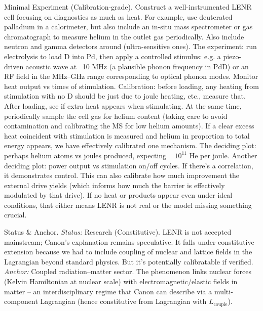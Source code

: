 \documentclass[11pt]{article}
\begin{document}
\begin{enumerate}
\end{enumerate}

Minimal Experiment (Calibration-grade). Construct a well-instrumented LENR cell focusing on diagnostics as much as heat. For example, use deuterated palladium in a calorimeter, but also include an in-situ mass spectrometer or gas chromatograph to measure helium in the outlet gas periodically. Also include neutron and gamma detectors around (ultra-sensitive ones). The experiment: run electrolysis to load D into Pd, then apply a controlled stimulus: e.g. a piezo-driven acoustic wave at ~10 MHz (a plausible phonon frequency in PdD) or an RF field in the MHz–GHz range corresponding to optical phonon modes. Monitor heat output vs times of stimulation. Calibration: before loading, any heating from stimulation with no D should be just due to joule heating, etc., measure that. After loading, see if extra heat appears when stimulating. At the same time, periodically sample the cell gas for helium content (taking care to avoid contamination and calibrating the MS for low helium amounts). If a clear excess heat coincident with stimulation is measured and helium in proportion to total energy appears, we have effectively calibrated one mechanism. The deciding plot: perhaps helium atoms vs joules produced, expecting ~ $10^{11}$ He per joule. Another deciding plot: power output vs stimulation on/off cycles. If there's a correlation, it demonstrates control. This can also calibrate how much improvement the external drive yields (which informs how much the barrier is effectively modulated by that drive). If no heat or products appear even under ideal conditions, that either means LENR is not real or the model missing something crucial.


Status & Anchor. \textit{Status:} Research (Constitutive). LENR is not accepted mainstream; Canon’s explanation remains speculative. It falls under constitutive extension because we had to include coupling of nuclear and lattice fields in the Lagrangian beyond standard physics. But it’s potentially calibratable if verified. \textit{Anchor:} Coupled radiation–matter sector. The phenomenon links nuclear forces (Kelvin Hamiltonian at nuclear scale) with electromagnetic/elastic fields in matter – an interdisciplinary regime that Canon can describe via a multi-component Lagrangian (hence constitutive from Lagrangian with $L_{\text{couple}}$).
\end{document}
